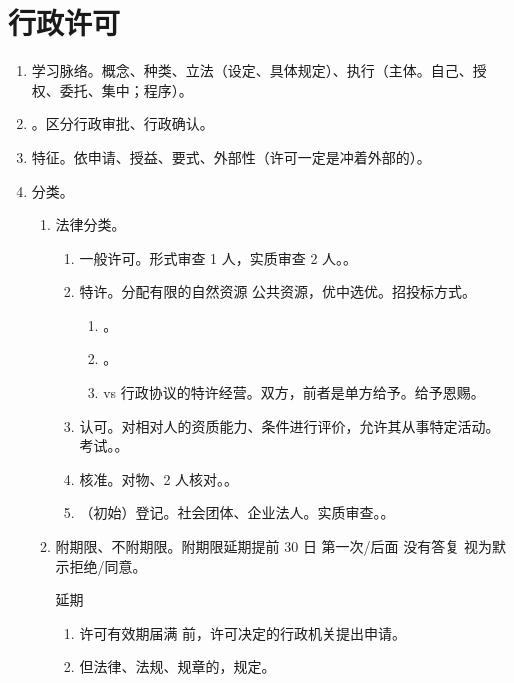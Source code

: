 \section{行政许可}
\begin{enumerate}
  \item 学习脉络。概念、种类、立法（设定、具体规定）、执行（主体。自己、授权、委托、集中；程序）。
  \item {}。区分行政审批、行政确认。
  \item 特征。依申请、授益、要式、外部性（许可一定是冲着外部的）。
  \item 分类。
        \begin{enumerate}
          \item 法律分类。
                \begin{enumerate}
                  \item 一般许可。形式审查 1 人，实质审查 2 人。。
                  \item 特许。分配有限的自然资源 \hz 公共资源，优中选优。招投标方式。
                        \begin{enumerate}
                          \item {}。
                          \item {}。
                          \item vs 行政协议的特许经营。双方，前者是单方给予。给予恩赐。
                        \end{enumerate}
                  \item 认可。对相对人的资质能力、条件进行评价，允许其从事特定活动。考试。。
                  \item 核准。对物、2 人核对。。
                  \item （初始）登记。社会团体、企业法人。实质审查。。
                \end{enumerate}
          \item 附期限、不附期限。附期限延期提前 30 日 \yjt 第一次/后面 \yjt 没有答复 \yjt 视为默示拒绝/同意。
                \begin{kk}{延期}
                  \begin{enumerate}
                    \item 许可有效期届满 前，许可决定的行政机关提出申请。
                    \item 但法律、法规、规章的，规定。

\end{enumerate}
\end{kk}
\end{enumerate}
\end{enumerate}
